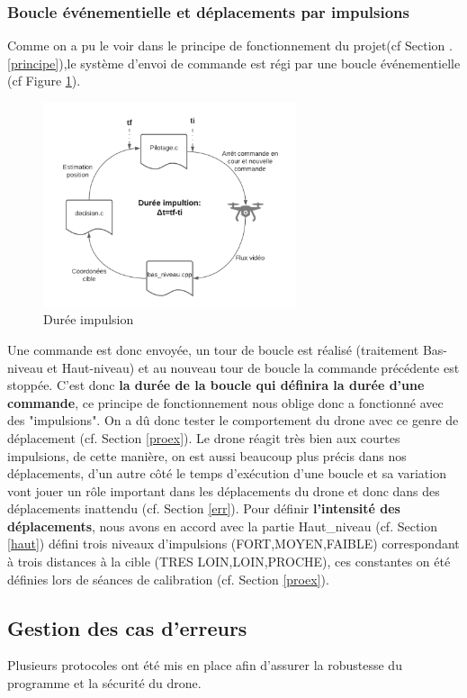 \documentclass[12pt]{article}
\begin{document}
\subsubsection{Boucle événementielle et déplacements par impulsions}
Comme on a pu le voir dans le principe de fonctionnement du projet(cf Section .\ref{principe}),le système d'envoi de commande est régi par une boucle événementielle (cf Figure \ref{fig:imp}).
\begin{figure}[H]
\centering
\includegraphics[height=6cm]{DureeImp.png}
\caption{Durée impulsion}
\label{fig:imp}
\end{figure}
Une commande est donc envoyée, un tour de boucle est réalisé (traitement Bas-niveau et Haut-niveau) et au nouveau tour de boucle la commande précédente est stoppée. C'est donc \textbf{la durée de la boucle qui définira la durée d'une commande}, ce principe de fonctionnement nous oblige donc a fonctionné avec des "impulsions". On a dû donc tester le comportement du drone avec ce genre de déplacement (cf. Section \ref{proex}). Le drone réagit très bien aux courtes impulsions, de cette manière, on est aussi beaucoup plus précis dans nos déplacements, d'un autre côté le temps d'exécution d'une boucle et sa variation vont jouer un rôle important dans les déplacements du drone et donc dans des déplacements inattendu (cf. Section \ref{err}).
Pour définir \textbf{l'intensité des déplacements}, nous avons en accord avec la partie Haut\_niveau (cf. Section \ref{haut}) défini trois niveaux d'impulsions (FORT,MOYEN,FAIBLE) correspondant à trois distances à la cible (TRES LOIN,LOIN,PROCHE), ces constantes on été définies lors de séances de calibration (cf. Section \ref{proex}).

\subsection{Gestion des cas d'erreurs\label{err}}
Plusieurs protocoles ont été mis en place afin d'assurer la robustesse du programme et la sécurité du drone.
\end{document}
